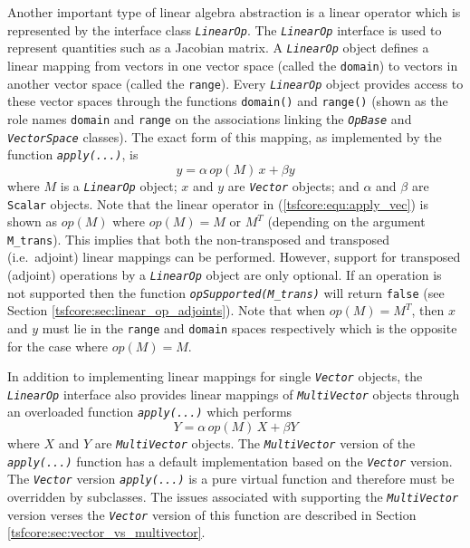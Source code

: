 Another important type of linear algebra abstraction is a linear
operator which is represented by the interface class
{}\texttt{\textit{LinearOp}}.  The {}\texttt{\textit{LinearOp}}
interface is used to represent quantities such as a Jacobian matrix. A
{}\texttt{\textit{LinearOp}} object defines a linear mapping from
vectors in one vector space (called the {}\texttt{domain}) to vectors
in another vector space (called the {}\texttt{range}).  Every
{}\texttt{\textit{LinearOp}} object provides access to these vector
spaces through the functions {}\texttt{domain()} and {}\texttt{range()}
(shown as the role names {}\texttt{domain} and {}\texttt{range} on the
associations linking the {}\texttt{\textit{OpBase}} and
{}\texttt{\textit{VectorSpace}} classes).  The exact form of this
mapping, as implemented by the function
{}\texttt{\textit{apply(\-...)}}, is
%
\begin{equation}
y = \alpha \, op(M) \, x + \beta y
\label{tsfcore:equ:apply_vec}
\end{equation}
%
where $M$ is a {}\texttt{\textit{LinearOp}} object; $x$ and $y$ are
{}\texttt{\textit{Vector}} objects; and $\alpha$ and $\beta$ are
{}\texttt{Scalar} objects.  Note that the linear operator in
(\ref{tsfcore:equ:apply_vec}) is shown as $op(M)$ where $op(M) = M$ or
$M^T$ (depending on the argument {}\texttt{M\_trans}). This implies
that both the non-transposed and transposed (i.e.~adjoint) linear
mappings can be performed.  However, support for transposed (adjoint)
operations by a {}\texttt{\textit{LinearOp}} object are only optional.
If an operation is not supported then the function
{}\texttt{\textit{opSupported(M\_trans)}} will return {}\texttt{false}
(see Section {}\ref{tsfcore:sec:linear_op_adjoints}).  Note that when
$op(M) = M^T$, then $x$ and $y$ must lie in the {}\texttt{range} and
{}\texttt{domain} spaces respectively which is the opposite for the
case where $op(M) = M$.

In addition to implementing linear mappings for single
{}\texttt{\textit{Vector}} objects, the {}\texttt{\textit{LinearOp}}
interface also provides linear mappings of
{}\texttt{\textit{Multi\-Vector}} objects through an overloaded function
{}\texttt{\textit{apply(\-...)}} which performs
%
\begin{equation}
Y = \alpha \, op(M) \, X + \beta Y
\label{tsfcore:equ:apply_multi_vec}
\end{equation}
%
where $X$ and $Y$ are {}\texttt{\textit{Multi\-Vector}} objects.  The
{}\texttt{\textit{Multi\-Vector}} version of the
{}\texttt{\textit{apply(\-...)}} function has a default implementation
based on the {}\texttt{\textit{Vector}} version.  The
{}\texttt{\textit{Vector}} version {}\texttt{\textit{apply(\-...)}}
is a pure virtual function and therefore must be overridden by
subclasses.  The issues associated with supporting the
{}\texttt{\textit{Multi\-Vector}} version verses the
{}\texttt{\textit{Vector}} version of this function are described in
Section {}\ref{tsfcore:sec:vector_vs_multivector}.

